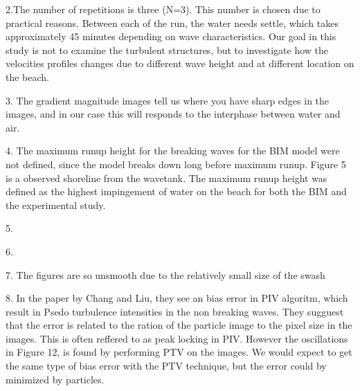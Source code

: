 2.The number of repetitions is three (N=3). This number is chosen due to practical reasons. Between each of the run, the water needs settle, which takes approximately 45 minutes depending on wave characteristics. Our goal in this study is not to examine the turbulent structures, but to investigate how the velocities profiles changes due to different wave height and at different location on the beach.

3. The gradient magnitude images tell us where you have sharp edges in the images, and in our case this will responds to the interphase between water and air. 



4. The maximum runup height for the breaking waves for the BIM model were not defined, since the model breaks down long before maximum runup. Figure 5 is a observed shoreline from the wavetank. The maximum runup height was defined as the highest impingement of water on the beach for both the BIM and the experimental study. 

5.


6. 

7. The figures are so unsmooth due to the relatively small size of the swash 


8. In the paper by Chang and Liu, they see an bias error in PIV algoritm, which result in Psedo turbulence intensities in the non breaking waves. They sugguest that the error is related to the ration of the particle image to the pixel size in the images. This is often reffered to as peak locking in PIV. However the oscillations in Figure 12, is found by  performing PTV on the images. We would expect to get the same type of bias error with the PTV technique, but the error could by minimized by particles. 
